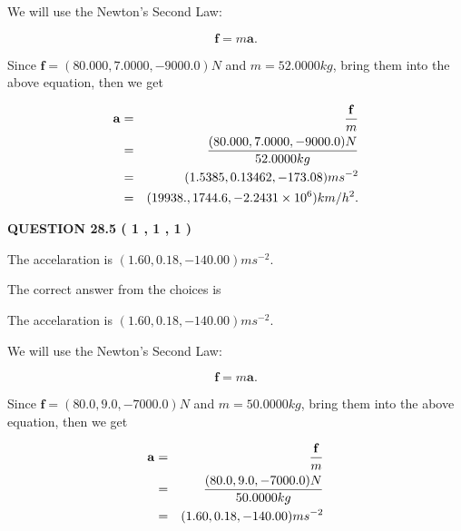 \documentclass[12pt]{article}
\begin{document}
 
 
 
\noindent{}

We will use the Newton's Second Law:
 
\[
\mathbf{f}=m\mathbf{a}.
\]
 
Since $\mathbf{f}=( %
80.000,  %
7.0000,  %
-9000.0 )N$
and $m= %
52.0000kg$, bring them into the above equation, then we get
 
\begin{eqnarray*}
\mathbf{a}&=&\frac{\mathbf{f}}m  \\
&=&\frac{(
80.000 ,
7.0000 ,
-9000.0 )N
}{ %
52.0000 kg}  \\
&=&(
1.5385 ,
0.13462,
-173.08
)ms^{-2} \\
&=&(
19938. ,
1744.6 ,
-2.2431 \times 10^{6}
)km/h^2.
\end{eqnarray*}
 
 
 
  
\vspace{0.2in}
  
{\textbf{\Large{QUESTION
28.5 
 (           1 ,           1 ,           1 )
}}}
  
  


 
 
\noindent{}
 
 
The accelaration is $  %
(
1.60,
0.18,
-140.00)
ms^{-2} $.
 
 
 
 
 
 
\noindent{}

The correct answer from the choices is


The accelaration is $  %
(
1.60,
0.18,
-140.00)
ms^{-2} $.
 
 
 
 
 
\noindent{}

We will use the Newton's Second Law:
 
\[
\mathbf{f}=m\mathbf{a}.
\]
 
Since $\mathbf{f}= %
(80.0 , 9.0 , -7000.0) N$
and $m= %
50.0000kg$, bring them into the above equation, then we get
 
\begin{eqnarray*}
\mathbf{a}&=&\frac{\mathbf{f}}m  \\
&=&\frac{ %
(80.0 , 9.0 , -7000.0) N}{ %
50.0000kg}  \\
&=& %
(1.60 , 0.18 , -140.00) ms^{-2}
\end{eqnarray*}
 
\end{document}

